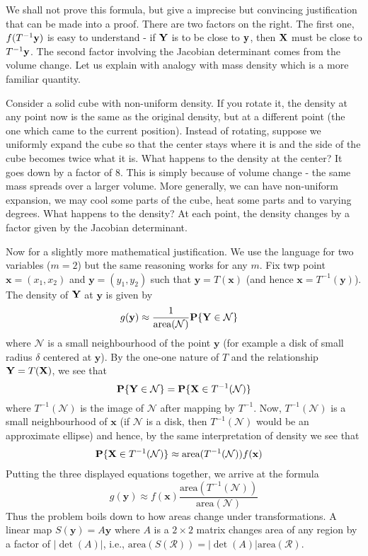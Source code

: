 \documentclass[preprint,  11pt]{amsart}
\newcommand{\para}[1]{\vspace{4mm}\noindent{\bfseries #1:}}
\newcommand\x{\mathbf{x}}
\newcommand\y{\mathbf{y}}
\theoremstyle{plain} %
\theoremstyle{definition} %
\begin{document}
\para{Justification} We shall not prove this formula, but give a imprecise but convincing justification that can be made into a proof. There are two factors on the right.  The first one, $f(T^{-1}{\bf y})$ is easy to understand - if ${\bf Y}$ is to be close to ${\bf y}$, then ${\bf X}$ must be close to $T^{-1}{\bf y}$. The second factor involving the Jacobian determinant comes from the volume change. Let us explain with analogy with mass density which is a more familiar quantity.

Consider a solid cube with non-uniform density. If you rotate it, the density at any point now is the same as the original density, but at a different point (the one which came to the current position). Instead of rotating, suppose we uniformly expand the cube so that the center stays where it is and the side of the cube becomes twice what it is. What happens to the density at the center? It goes down by a factor of $8$. This is simply because of volume change - the same mass spreads over a larger volume. More generally, we can have non-uniform expansion, we may cool some parts of the cube, heat some parts and to varying degrees. What happens to the density? At each point, the density changes by a factor given by the Jacobian determinant.

Now for a slightly more mathematical justification. We use the language for two variables ($m=2$) but the same reasoning works for any $m$. Fix twp point $\x=(x_{1},x_{2})$ and $\y=(y_{1},y_{2})$ such that $\y=T(\x)$ (and hence $\x=T^{-1}(\y)$). The density of ${\bf Y}$ at $\y$ is given by 
\begin{align*} 
g(\y)&\approx \frac{1}{\mbox{area}(\mathcal N)}\mathbf{P}\{{\bf Y}\in \mathcal N\}
\end{align*}
where $\mathcal N$ is a small neighbourhood of the point $\y$ (for example a disk of small radius $\delta$ centered at $\y$). By the one-one nature of $T$ and the relationship ${\bf Y}=T({\bf X})$, we see that $$\mathbf{P}\{{\bf Y}\in \mathcal N\}=\mathbf{P}\{{\bf X}\in T^{-1}(\mathcal N)\}$$ where $T^{-1}(\mathcal N)$ is the image of $\mathcal N$ after mapping by $T^{-1}$.  Now, $T^{-1}(\mathcal N)$ is a small neighbourhood of $\x$ (if $\mathcal N$ is a disk, then $T^{-1}(\mathcal N)$ would be an approximate ellipse) and hence, by the same interpretation of density we see that
\begin{align*} 
\mathbf{P}\{{\bf X}\in T^{-1}(\mathcal N)\}&\approx \mbox{area}(T^{-1}(\mathcal N))f(\x)
\end{align*}
Putting the three displayed equations together, we arrive at the formula
$$
g(\y)\approx f(\x)\frac{\mbox{area}(T^{-1}(\mathcal N))}{\mbox{area}(\mathcal N)}
$$
Thus the problem boils down to how areas change under transformations. A linear map $S(\y)=A\y$ where $A$ is a $2\times 2$ matrix changes area of any region by a factor of $|\det(A)|$, i.e., $\mbox{area}(S(\mathcal R))=|\det(A)|\mbox{area}(\mathcal R)$. 
\end{document}
